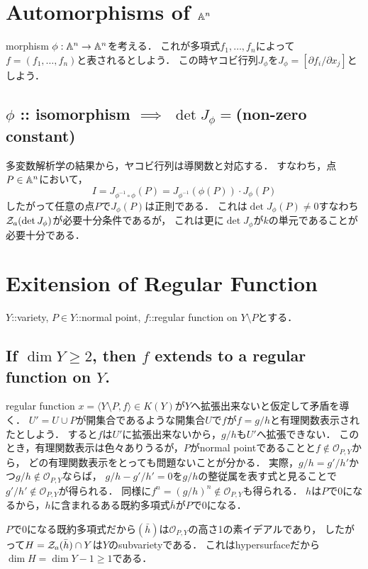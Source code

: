 \documentclass[a4paper]{jarticle}
\begin{document}
\section{Automorphisms of $\mathbb{A}^n$}
    morphism $\phi:\mathbb{A}^n \to \mathbb{A}^n$を考える．
    これが多項式$f_1, \dots, f_n$によって$f=(f_1, \dots, f_n)$と表されるとしよう．
    この時ヤコビ行列$J_{\phi}$を$J_{\phi}=[\partial f_i/\partial x_j]$としよう．

    \subsection{$\phi$ :: isomorphism $\implies$ $\det J_{\phi}=$(non-zero constant)}
    多変数解析学の結果から，ヤコビ行列は導関数と対応する．
    すなわち，点$P \in \mathbb{A}^n$において，
    \[ I=J_{\phi^{-1} \circ \phi}(P)=J_{\phi^{-1}}(\phi(P)) \cdot J_{\phi}(P) \]
    したがって任意の点$P$で$J_{\phi}(P)$は正則である．
    これは$\det J_{\phi}(P) \neq 0$すなわち$\mathcal{Z}_a(\det J_{\phi})$が必要十分条件であるが，
    これは更に$\det J_{\phi}$が$k$の単元であることが必要十分である．

\section{Exitension of Regular Function}
    $Y$::variety, $P \in Y$::normal point, $f$::regular function on $Y \setminus P$とする．

    \subsection{If $\dim Y \geq 2$, then $f$ extends to a regular function on $Y$.}
    regular function $x=\langle Y \setminus P, f \rangle \in K(Y)$が$Y$へ拡張出来ないと仮定して矛盾を導く．
    $U'=U \cup P$が開集合であるような開集合$U$で$f$が$f=g/h$と有理関数表示されたとしよう．
    すると$f$は$U'$に拡張出来ないから，$g/h$も$U'$へ拡張できない．
    このとき，有理関数表示は色々ありうるが，$P$がnormal pointであることと$f \not \in \mathcal{O}_{P,Y}$から，
    どの有理関数表示をとっても問題ないことが分かる．
    実際，$g/h=g'/h'$かつ$g/h \not \in \mathcal{O}_{P,Y}$ならば，
    $g/h- g'/h'=0$を$g/h$の整従属を表す式と見ることで$g'/h' \not \in \mathcal{O}_{P,Y}$が得られる．
    同様に$f^n=(g/h)^n \not \in \mathcal{O}_{P,Y}$も得られる．
    $h$は$P$で0になるから，$h$に含まれるある既約多項式$\bar{h}$が$P$で0になる．

    $P$で0になる既約多項式だから$(\bar{h})$は$\mathcal{O}_{P,Y}$の高さ1の素イデアルであり，
    したがって$H=\mathcal{Z}_a(\bar{h}) \cap Y$は$Y$のsubvarietyである．
    これはhypersurfaceだから$\dim H=\dim Y-1 \geq 1$である．
\end{document}
